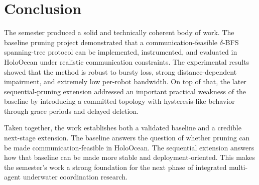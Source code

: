 \documentclass[11pt,a4paper]{article}
\begin{document}
\section{Conclusion}

The semester produced a solid and technically coherent body of work. The baseline pruning project demonstrated that a communication-feasible \(\delta\)-BFS spanning-tree protocol can be implemented, instrumented, and evaluated in HoloOcean under realistic communication constraints. The experimental results showed that the method is robust to bursty loss, strong distance-dependent impairment, and extremely low per-robot bandwidth. On top of that, the later sequential-pruning extension addressed an important practical weakness of the baseline by introducing a committed topology with hysteresis-like behavior through grace periods and delayed deletion.

Taken together, the work establishes both a validated baseline and a credible next-stage extension. The baseline answers the question of whether pruning can be made communication-feasible in HoloOcean. The sequential extension answers how that baseline can be made more stable and deployment-oriented. This makes the semester's work a strong foundation for the next phase of integrated multi-agent underwater coordination research.
\end{document}
